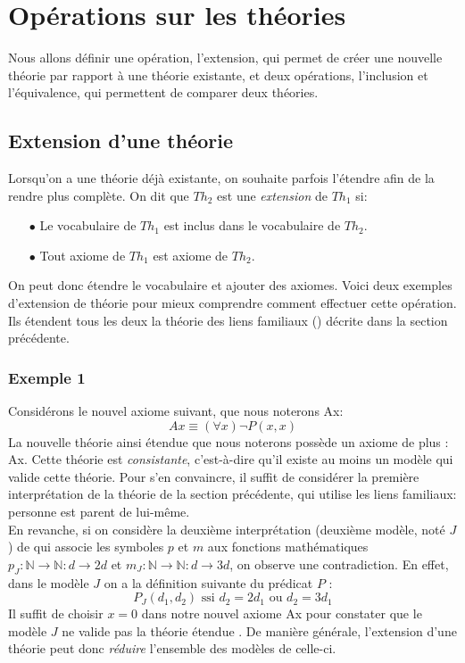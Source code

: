 {%

\section{Opérations sur les théories}

Nous allons définir une opération, l'extension, qui permet de créer une nouvelle théorie par rapport à une théorie existante,
et deux opérations, l'inclusion et l'équivalence, qui permettent de comparer deux théories.

\subsection{Extension d'une théorie}
Lorsqu'on a une théorie déjà existante, on souhaite parfois l'étendre afin de la rendre plus complète.
On dit que $Th_2$ est une {\em extension} de $Th_1$ si:
\begin{itemize}
\item[$\bullet$] Le vocabulaire de $Th_1$ est inclus dans le vocabulaire de $Th_2$.
\item[$\bullet$] Tout axiome de $Th_1$ est axiome de $Th_2$.
\end{itemize}
On peut donc étendre le vocabulaire et ajouter des axiomes.
Voici deux exemples d'extension de théorie pour mieux comprendre comment effectuer cette opération. Ils étendent tous les deux
la théorie des liens familiaux () décrite dans la section précédente.

\subsubsection{Exemple 1}

Considérons le nouvel axiome suivant, que nous noterons Ax:
$$ Ax \equiv (\forall x) \neg P(x,x) $$
La nouvelle théorie ainsi étendue que nous noterons  possède un axiome de plus : Ax. Cette théorie 
est {\em consistante}, c'est-à-dire qu'il existe au moins un modèle qui valide cette théorie.
Pour s'en convaincre, il suffit de considérer la première interprétation de la théorie  de la section précédente,
qui utilise les liens familiaux: personne est parent de lui-même.\\

En revanche, si on considère la deuxième interprétation (deuxième modèle, noté $J$) de 
qui associe les symboles $p$ et $m$ aux fonctions mathématiques $p_J : \mathbb{N} \rightarrow \mathbb{N} : d \rightarrow 2d$ et $m_J : \mathbb{N} \rightarrow \mathbb{N} : d \rightarrow 3d$, on observe une contradiction.
En effet, dans le modèle $J$ on a la définition suivante du prédicat $P$ :
$$ P_J(d_1, d_2) \textrm{ ssi } d_2 = 2d_1 \textrm{ ou } d_2 = 3d_1$$
Il suffit de choisir $x=0$ dans notre nouvel axiome Ax pour constater que le modèle $J$ ne valide pas la théorie étendue .
De manière générale, l'extension d'une théorie peut donc {\em réduire} l'ensemble des modèles de celle-ci.

}

